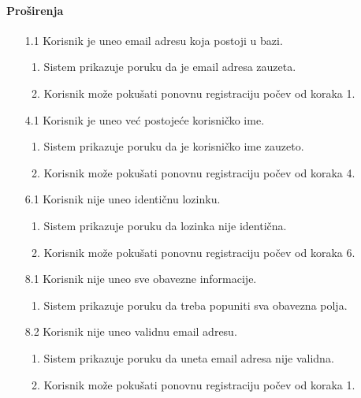\documentclass[a4paper,12pt]{report}
\begin{document}
    \paragraph*{Proširenja} 
    \begin{enumerate}
    
        \item[1.1] Korisnik je uneo email adresu koja postoji u bazi.
            \begin{enumerate}[noitemsep,topsep=-8pt]
                \item Sistem prikazuje poruku da je email adresa zauzeta.
                \item Korisnik može pokušati ponovnu registraciju počev od koraka 1.
            \end{enumerate}
        
        \item[4.1] Korisnik je uneo već postojeće korisničko ime.
            \begin{enumerate}[noitemsep,topsep=-8pt]
                \item Sistem prikazuje poruku da je korisničko ime zauzeto.
                \item Korisnik može pokušati ponovnu registraciju počev od koraka 4.
            \end{enumerate}
            
        \item[6.1] Korisnik nije uneo identičnu lozinku.
            \begin{enumerate}[noitemsep,topsep=-8pt]
                \item Sistem prikazuje poruku da lozinka nije identična.
                \item Korisnik može pokušati ponovnu registraciju počev od koraka 6.
            \end{enumerate}
    
        \item[8.1] Korisnik nije uneo sve obavezne informacije.
            \begin{enumerate}[noitemsep,topsep=-8pt]
                \item Sistem prikazuje poruku da treba popuniti sva obavezna polja.
            \end{enumerate}
 
        \item[8.2] Korisnik nije uneo validnu email adresu.
             \begin{enumerate}[noitemsep,topsep=-8pt]
                \item Sistem prikazuje poruku da uneta email adresa nije validna.
                \item Korisnik može pokušati ponovnu registraciju počev od koraka 1.
            \end{enumerate}
            

\end{enumerate}
\end{document}
